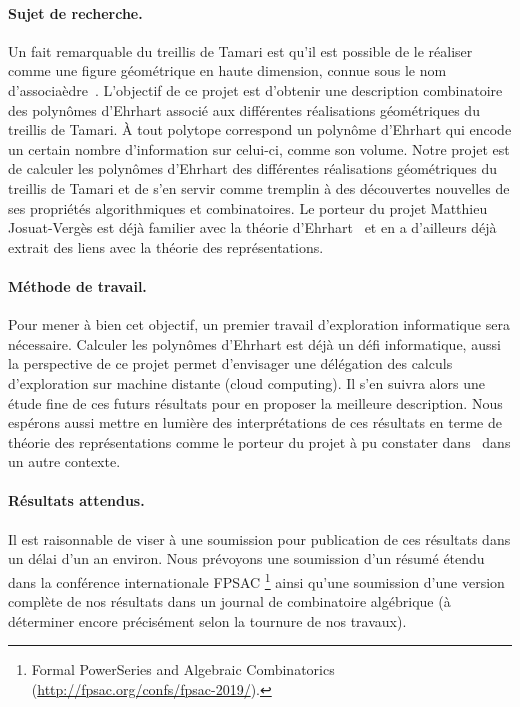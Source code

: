 \documentclass[a4paper, 10pt]{article}
\numberwithin{equation}{subsection}
\begin{document}
\paragraph{Sujet de recherche.}
Un fait remarquable du treillis de Tamari est qu'il est possible de le
réaliser comme une figure géométrique en haute dimension, connue sous le
nom d'associaèdre~\cite{Lod04}. L'objectif de ce projet est d'obtenir
une description combinatoire des polynômes d'Ehrhart associé aux
différentes réalisations géométriques du treillis de Tamari. À tout
polytope correspond un polynôme d'Ehrhart qui encode un certain nombre
d'information sur celui-ci, comme son volume. Notre projet est de
calculer les polynômes d'Ehrhart des différentes réalisations
géométriques du treillis de Tamari et de s'en servir comme tremplin à
des découvertes nouvelles de ses propriétés algorithmiques et
combinatoires. Le porteur du projet Matthieu Josuat-Vergès est déjà
familier avec la théorie d'Ehrhart~\cite{HJV16} et en a d'ailleurs déjà
extrait des liens avec la théorie des représentations.
\smallbreak

\vspace{-.25cm}

\paragraph{Méthode de travail.}
Pour mener à bien cet objectif, un premier travail d'exploration
informatique sera nécessaire. Calculer les polynômes d'Ehrhart est déjà
un défi informatique, aussi la perspective de ce projet permet
d'envisager une délégation des calculs d'exploration sur machine
distante (cloud computing). Il s'en suivra alors une étude fine de ces
futurs résultats pour en proposer la meilleure description. Nous
espérons aussi mettre en lumière des interprétations de ces résultats en
terme de théorie des représentations comme le porteur du projet à pu
constater dans~\cite{HJV16} dans un autre contexte.
\smallbreak

\vspace{-.25cm}

\paragraph{Résultats attendus.}
Il est raisonnable de viser à une soumission pour publication de ces
résultats dans un délai d'un an environ. Nous prévoyons une soumission
d'un résumé étendu dans la conférence internationale FPSAC%
\footnote{Formal PowerSeries and Algebraic Combinatorics
(\url{http://fpsac.org/confs/fpsac-2019/}).}
ainsi qu'une soumission d'une
version complète de nos résultats dans un journal de combinatoire
algébrique (à déterminer encore précisément selon la tournure de nos
travaux).
\smallbreak
\end{document}
